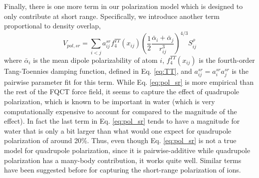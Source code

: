 \documentclass[journal=jctcce,manuscript=article]{achemso}
\begin{document}
Finally, there is one more term in our polarization model which is designed to only contribute at short range. Specifically, we introduce another term proportional to density overlap,
\begin{equation}
  V_{pol,sr}=\sum_{i<j}a_{ij}^{sr}f_4^{TT}(x_{ij})\left(\frac{1}{2}\frac{\bar{\alpha}_i + \bar{\alpha}_j}{r_{ij}^3}\right)^{4/3}S_{ij}^{\rho}
\label{eq:pol_sr}
\end{equation}
where $\bar{\alpha}_i$ is the mean dipole polarizability of atom $i$, $f_4^{TT}(x_{ij})$ is the fourth-order Tang-Toennies damping function, defined in Eq. \ref{eq:TT}, and $a_{ij}^{sr}=a_{i}^{sr}a_{j}^{sr}$ is the pairwise parameter fit for this term. While Eq. \ref{eq:pol_sr} is more empirical than the rest of the FQCT force field, it seems to capture the effect of quadrupole polarization, which is known to be important in water\cite{herman2023accurate} (which is very computationally expensive to account for compared to the magnitude of the effect). In fact the last term in Eq. \ref{eq:pol_sr} tends to have a magnitude for water that is only a bit larger than what would one expect for quadrupole polarization of around 20\%. Thus, even though Eq. \ref{eq:pol_sr} is  not a true model for quadrupole polarization, since it is pairwise-additive while quadrupole polarization has a many-body contribution, it works quite well. Similar terms have been suggested before for capturing the short-range polarization of ions.\cite{sheng2022semiempirical}
\end{document}

